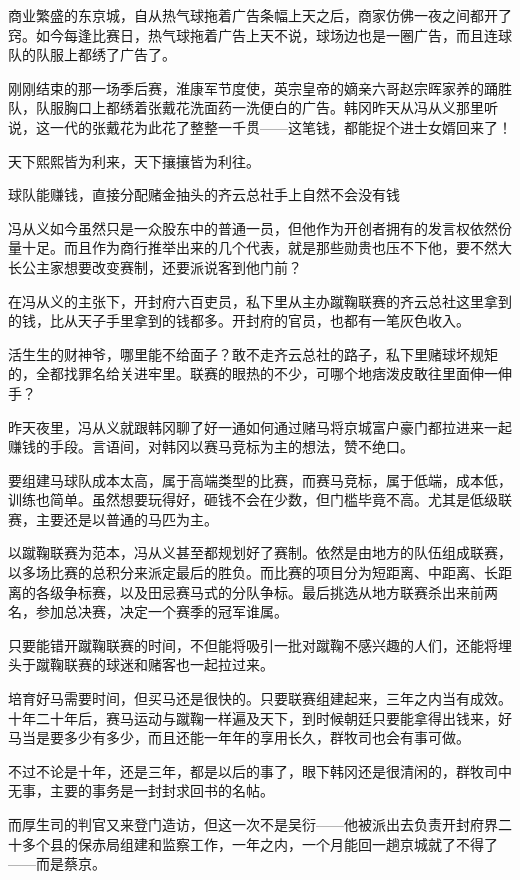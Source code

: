 商业繁盛的东京城，自从热气球拖着广告条幅上天之后，商家仿佛一夜之间都开了窍。如今每逢比赛日，热气球拖着广告上天不说，球场边也是一圈广告，而且连球队的队服上都绣了广告了。

刚刚结束的那一场季后赛，淮康军节度使，英宗皇帝的嫡亲六哥赵宗晖家养的踊胜队，队服胸口上都绣着张戴花洗面药一洗便白的广告。韩冈昨天从冯从义那里听说，这一代的张戴花为此花了整整一千贯——这笔钱，都能捉个进士女婿回来了！

天下熙熙皆为利来，天下攘攘皆为利往。

球队能赚钱，直接分配赌金抽头的齐云总社手上自然不会没有钱

冯从义如今虽然只是一众股东中的普通一员，但他作为开创者拥有的发言权依然份量十足。而且作为商行推举出来的几个代表，就是那些勋贵也压不下他，要不然大长公主家想要改变赛制，还要派说客到他门前？

在冯从义的主张下，开封府六百吏员，私下里从主办蹴鞠联赛的齐云总社这里拿到的钱，比从天子手里拿到的钱都多。开封府的官员，也都有一笔灰色收入。

活生生的财神爷，哪里能不给面子？敢不走齐云总社的路子，私下里赌球坏规矩的，全都找罪名给关进牢里。联赛的眼热的不少，可哪个地痞泼皮敢往里面伸一伸手？

昨天夜里，冯从义就跟韩冈聊了好一通如何通过赌马将京城富户豪门都拉进来一起赚钱的手段。言语间，对韩冈以赛马竞标为主的想法，赞不绝口。

要组建马球队成本太高，属于高端类型的比赛，而赛马竞标，属于低端，成本低，训练也简单。虽然想要玩得好，砸钱不会在少数，但门槛毕竟不高。尤其是低级联赛，主要还是以普通的马匹为主。

以蹴鞠联赛为范本，冯从义甚至都规划好了赛制。依然是由地方的队伍组成联赛，以多场比赛的总积分来派定最后的胜负。而比赛的项目分为短距离、中距离、长距离的各级争标赛，以及田忌赛马式的分队争标。最后挑选从地方联赛杀出来前两名，参加总决赛，决定一个赛季的冠军谁属。

只要能错开蹴鞠联赛的时间，不但能将吸引一批对蹴鞠不感兴趣的人们，还能将埋头于蹴鞠联赛的球迷和赌客也一起拉过来。

培育好马需要时间，但买马还是很快的。只要联赛组建起来，三年之内当有成效。十年二十年后，赛马运动与蹴鞠一样遍及天下，到时候朝廷只要能拿得出钱来，好马当是要多少有多少，而且还能一年年的享用长久，群牧司也会有事可做。

不过不论是十年，还是三年，都是以后的事了，眼下韩冈还是很清闲的，群牧司中无事，主要的事务是一封封求回书的名帖。

而厚生司的判官又来登门造访，但这一次不是吴衍——他被派出去负责开封府界二十多个县的保赤局组建和监察工作，一年之内，一个月能回一趟京城就了不得了——而是蔡京。

